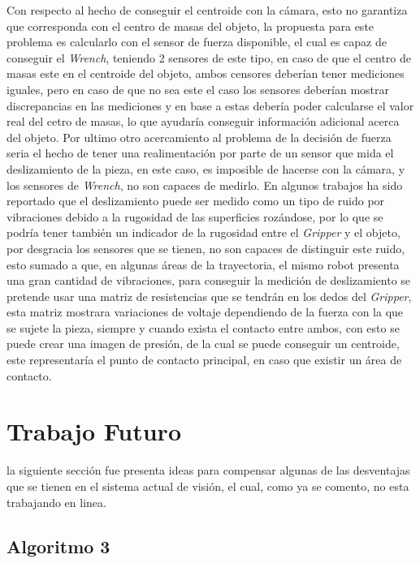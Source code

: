 Con respecto al hecho de conseguir el centroide con la cámara, esto no garantiza que corresponda con el centro de masas del objeto, la propuesta para este problema es calcularlo con el sensor de fuerza disponible, el cual es capaz de conseguir el \textit{Wrench}, teniendo 2 sensores de este tipo, en caso de que el centro de masas este en el centroide del objeto, ambos censores deberían tener mediciones iguales, pero en caso de que no sea este el caso los sensores deberían mostrar discrepancias en las mediciones y en base a estas debería poder calcularse el valor real del cetro de masas, lo que ayudaría conseguir información adicional acerca del objeto.
Por ultimo otro acercamiento al problema de la decisión de fuerza seria el hecho de tener una realimentación por parte de un sensor que mida el deslizamiento de la pieza, en este caso, es imposible de hacerse con la cámara, y los sensores de \textit{Wrench}, no son capaces de medirlo. En algunos trabajos ha sido reportado que el deslizamiento puede ser medido como un tipo de ruido por vibraciones debido a la rugosidad de las superficies rozándose, por lo que se podría tener también un indicador de la rugosidad entre el \textit{Gripper} y el objeto, por desgracia los sensores que se tienen, no son capaces de distinguir este ruido, esto sumado a que, en algunas áreas de la trayectoria, el mismo robot presenta una gran cantidad de vibraciones, para conseguir la medición de deslizamiento se pretende usar una matriz de resistencias que se tendrán en los dedos del \textit{Gripper}, esta matriz mostrara variaciones de voltaje dependiendo de la fuerza con la que se sujete la pieza, siempre y cuando exista el contacto entre ambos, con esto se puede crear una imagen de presión, de la cual se puede conseguir un centroide, este representaría el punto de contacto principal, en caso que existir un área de contacto. 

\section{Trabajo Futuro}

la siguiente sección fue presenta ideas para compensar algunas de las desventajas que se tienen en el sistema actual de visión, el cual, como ya se comento, no esta trabajando en linea.

\subsection{Algoritmo  3}

